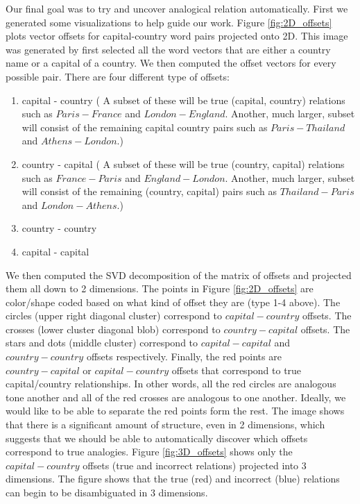 Our final goal was to try and uncover analogical relation automatically. First we generated some visualizations to help guide our work. Figure \ref{fig:2D_offsets} plots vector offsets for capital-country word pairs projected onto 2D. This image was generated by first selected all the word vectors that are either a country name or a capital of a country. We then computed the offset vectors for every possible pair. There are four different type of offsets:
\begin{enumerate}
\item capital - country ( A subset of these will be true (capital, country) relations such as $Paris - France$ and $London - England$. Another, much larger, subset will consist of the remaining capital country pairs such as $Paris - Thailand$ and $Athens - London$.)
\item country - capital ( A subset of these will be true (country, capital) relations such as $France - Paris$ and $England - London$. Another, much larger, subset will consist of the remaining (country, capital) pairs such as $Thailand - Paris$ and $London - Athens$.)
\item country - country
\item capital - capital
\end{enumerate}

We then computed the SVD decomposition of the matrix of offsets and projected them all down to 2 dimensions. The points in Figure \ref{fig:2D_offsets} are color/shape coded based on what kind of offset they are (type 1-4 above). The circles (upper right diagonal cluster) correspond to $capital - country$ offsets. The crosses (lower cluster diagonal blob) correspond to $country - capital$ offsets. The stars and dots (middle cluster) correspond to $capital - capital$ and $country - country$ offsets respectively. Finally, the red points are $country - capital$ or $capital - country$ offsets that correspond to true capital/country relationships. In other words, all the red circles are analogous tone another and all of the red crosses are analogous to one another. Ideally, we would like to be able to separate  the red points form the rest. The image shows that there is a significant amount of structure, even in 2 dimensions, which suggests that we should be able to automatically discover which offsets correspond to true analogies. Figure \ref{fig:3D_offsets} shows only the $capital - country$ offsets (true and incorrect relations) projected into 3 dimensions. The figure shows that the true (red) and incorrect (blue) relations can begin to be disambiguated in 3 dimensions. 

